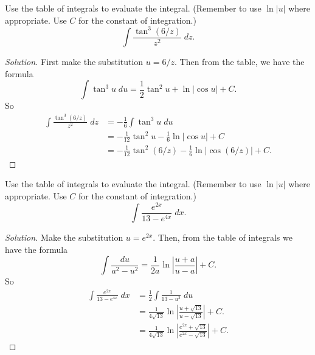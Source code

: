 \begin{problem}[WebAssign, HW 15, \# 3]
Use the table of integrals to evaluate the integral. (Remember to use
$\ln|u|$ where appropriate. Use $C$ for the constant of integration.)
\[
\int\frac{\tan^3(6/z)}{z^2}\;dz.
\]
\end{problem}
\begin{proof}[Solution]
First make the substitution $u=6/z$. Then from the table, we have the
formula
\begin{equation}
  \label{eq:table-formula-69}
\int\tan^3 u\;du=\frac{1}{2}\tan^2 u+\ln|\cos u|+C.
\end{equation}
So
\begin{align*}
\int\frac{\tan^3(6/z)}{z^2}\;dz
&=-\frac{1}{6}\int\tan^3 u\;du\\
&=-\frac{1}{12}\tan^2 u-\frac{1}{6}\ln|\cos u|+C\\
&=\boxed{-\frac{1}{12}\tan^2(6/z)-\frac{1}{6}\ln|\cos(6/z)|+C.}
\end{align*}
\end{proof}

\begin{problem}[WebAssign, HW 15, \# 4]
Use the table of integrals to evaluate the integral. (Remember to use
$\ln|u|$ where appropriate. Use $C$ for the constant of integration.)
\[
\int\frac{e^{2x}}{13-e^{4x}}\;dx.
\]
\end{problem}
\begin{proof}[Solution]
Make the substitution $u=e^{2x}$. Then, from the table of integrals we have
the formula
\begin{equation}
  \label{eq:table-formula-19}
\int\frac{du}{a^2-u^2}=\frac{1}{2a}\ln\left|\frac{u+a}{u-a}\right|+C.
\end{equation}
So
\begin{align*}
\int\frac{e^{2x}}{13-e^{4x}}\;dx
&=\frac{1}{2}\int\frac{1}{13-u^2}\;du\\
&=\frac{1}{4\sqrt{13}}\ln\left|\frac{u+\sqrt{13}}{u-\sqrt{13}}\right|+C.\\
&=\boxed{\frac{1}{4\sqrt{13}}\ln\left|\frac{e^{2x}+\sqrt{13}}{e^{2x}-\sqrt{13}}\right|+C.}
\end{align*}
\end{proof}

